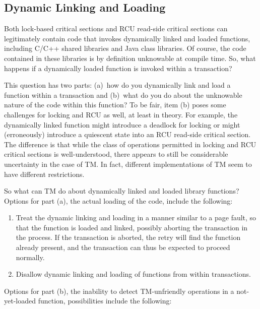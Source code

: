 \subsection{Dynamic Linking and Loading}
\label{sec:future:Dynamic Linking and Loading}

Both lock-based critical sections and RCU read-side critical sections
can legitimately contain code that invokes dynamically linked and loaded
functions, including C/C++ shared libraries and Java class libraries.
Of course, the code contained in these libraries is by definition
unknowable at compile time.
So, what happens if a dynamically loaded function is invoked within
a transaction?

This question has two parts: (a)~how do you dynamically link and load a
function within a transaction and (b)~what do you do about the unknowable
nature of the code within this function?
To be fair, item (b) poses some challenges for locking and RCU as well,
at least in theory.
For example, the dynamically linked function might introduce a deadlock
for locking or might (erroneously) introduce a quiescent state into an
RCU read-side critical section.
The difference is that while the class of operations permitted in locking
and RCU critical sections is well-understood, there appears to still be
considerable uncertainty in the case of TM.
In fact, different implementations of TM seem to have different restrictions.

So what can TM do about dynamically linked and loaded library functions?
Options for part (a), the actual loading of the code, include the following:

\begin{enumerate}
\item	Treat the dynamic linking and loading in a manner similar to a
	page fault, so that the function is loaded and linked, possibly
	aborting the transaction in the process.
	If the transaction is aborted, the retry will find the function
	already present, and the transaction can thus be expected to
	proceed normally.
\item	Disallow dynamic linking and loading of functions from within
	transactions. 
\end{enumerate}

Options for part (b), the inability to detect TM-unfriendly operations
in a not-yet-loaded function, possibilities include the following:

